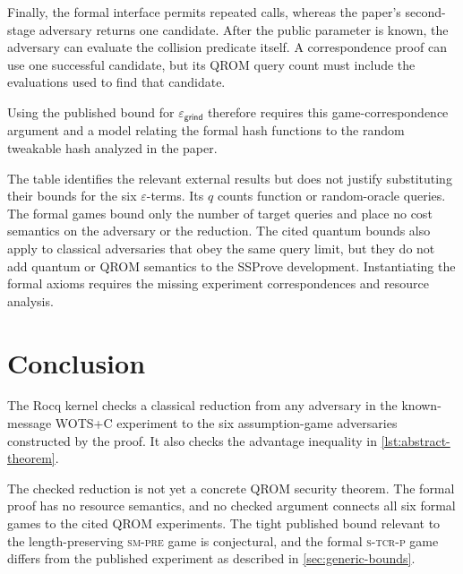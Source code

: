 \documentclass[11pt,a4paper]{article}
\theoremstyle{plain}
\theoremstyle{definition}
\DeclareRobustCommand{\coq}[1]{\texttt{\detokenize{#1}}}
\newcommand{\SSProve}{\textsf{SSProve}\xspace}
\newcommand{\WOTSC}{\textsf{WOTS+C}\xspace}
\newcommand{\smpre}{\textsc{sm-pre}\xspace}
\newcommand{\stcrp}{\textsc{s-tcr-p}\xspace}
\newcommand{\epsgr}{\varepsilon_{\mathsf{grind}}}
\begin{document}
Finally, the formal interface permits repeated \coq{SCHECK} calls, whereas the paper's second-stage adversary returns one candidate.
After the public parameter is known, the adversary can evaluate the collision predicate itself.
A correspondence proof can use one successful candidate, but its QROM query count must include the evaluations used to find that candidate.

Using the published bound for \(\epsgr\) therefore requires this game-correspondence argument and a model relating the formal hash functions to the random tweakable hash analyzed in the paper.

The table identifies the relevant external results but does not justify substituting their bounds for the six \(\varepsilon\)-terms.
Its \(q\) counts function or random-oracle queries.
The formal games bound only the number of target queries and place no cost semantics on the adversary or the reduction.
The cited quantum bounds also apply to classical adversaries that obey the same query limit, but they do not add quantum or QROM semantics to the \SSProve development.
Instantiating the formal axioms requires the missing experiment correspondences and resource analysis.

\section{Conclusion}

The Rocq kernel checks a classical reduction from any \coq{ValidPackage} adversary in the known-message \WOTSC experiment to the six assumption-game adversaries constructed by the proof.
It also checks the advantage inequality in \cref{lst:abstract-theorem}.

The checked reduction is not yet a concrete QROM security theorem.
The formal proof has no resource semantics, and no checked argument connects all six formal games to the cited QROM experiments.
The tight published bound relevant to the length-preserving \smpre game is conjectural, and the formal \stcrp game differs from the published experiment as described in \cref{sec:generic-bounds}.



\end{document}
